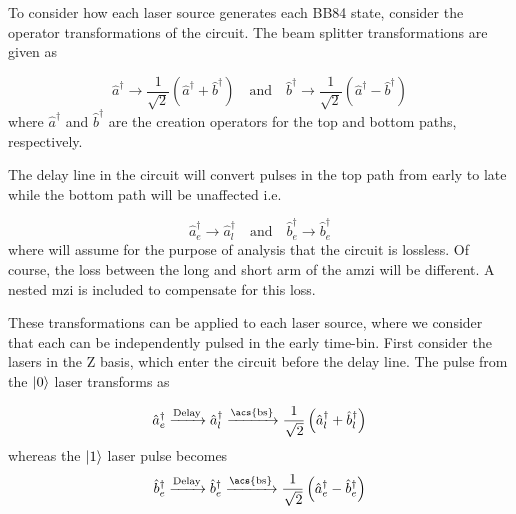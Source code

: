 

To consider how each laser source generates each BB84 state, consider the operator transformations of the circuit. The beam splitter transformations are given as 

\begin{equation}
	\hat{a}^\dagger \rightarrow \frac{1}{\sqrt{2}}\left(\hat{a}^\dagger + \hat{b}^\dagger\right) \quad \text{and} \quad \hat{b}^\dagger \rightarrow \frac{1}{\sqrt{2}}\left(\hat{a}^\dagger - \hat{b}^\dagger\right)
\end{equation}
where $\hat{a}^\dagger$ and $\hat{b}^\dagger$ are the creation operators for the top and bottom paths, respectively.

The delay line in the circuit will convert pulses in the top path from early to late while the bottom path will be unaffected i.e.

\begin{equation}
	\hat{a}^\dagger_e \rightarrow \hat{a}^\dagger_l \quad \text{and} \quad \hat{b}^\dagger_e \rightarrow \hat{b}^\dagger_e
\end{equation}
where will assume for the purpose of analysis that the circuit is lossless. Of course, the loss between the long and short arm of the \ac{amzi} will be different. A nested \ac{mzi} is included to compensate for this loss.

These transformations can be applied to each laser source, where we consider that each can be independently pulsed in the early time-bin. First consider the lasers in the Z basis, which enter the circuit before the delay line. The pulse from the $\ket{0}$ laser transforms as

\begin{equation}
	\hat{a}^\dagger_e \xrightarrow{\text{Delay}} \hat{a}^\dagger_l \xrightarrow{\text{\acs{bs}}} \frac{1}{\sqrt{2}}\left(\hat{a}^\dagger_l + \hat{b}^\dagger_l\right)
\end{equation}
whereas the $\ket{1}$ laser pulse becomes
\begin{equation}
	\hat{b}^\dagger_e \xrightarrow{\text{Delay}} \hat{b}^\dagger_e \xrightarrow{\text{\acs{bs}}} \frac{1}{\sqrt{2}}\left(\hat{a}^\dagger_e - \hat{b}^\dagger_e\right)
\end{equation}

